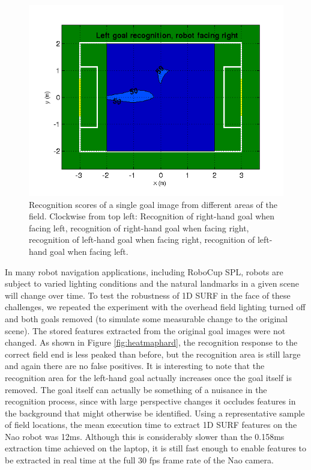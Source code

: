 \documentclass[runningheads,a4paper]{llncs}
\begin{document}
\begin{figure} [h]
\begin{minipage}[b]{0.5\textwidth}
\end{minipage}
\begin{minipage}[b]{0.5\textwidth}
\centering
\includegraphics[width=1\textwidth]{figures/LR}
\end{minipage}
\caption{Recognition scores of a single goal image from different areas of the field. Clockwise from top left: Recognition of right-hand goal when facing left, recognition of right-hand goal when facing right, recognition of left-hand goal when facing right, recognition of left-hand goal when facing left.} \label{fig:heatmap}
\end{figure}

In many robot navigation applications, including RoboCup SPL, robots are subject to varied lighting conditions and the natural landmarks in a given scene will change over time. To test the robustness of 1D SURF in the face of these challenges, we repeated the experiment with the overhead field lighting turned off and both goals removed (to simulate some measurable change to the original scene). The stored features extracted from the original goal images were not changed. As shown in Figure \ref{fig:heatmaphard}, the recognition response to the correct field end is less peaked than before, but the recognition area is still large and again there are no false positives. It is interesting to note that the recognition area for the left-hand goal actually increases once the goal itself is removed. The goal itself can actually be something of a nuisance in the recognition process, since with large perspective changes it occludes features in the background that might otherwise be identified. Using a representative sample of field locations, the mean execution time to extract 1D SURF features on the Nao robot was 12ms. Although this is considerably slower than the 0.158ms extraction time achieved on the laptop, it is still fast enough to enable features to be extracted in real time at the full 30 fps frame rate of the Nao camera.
\end{document}
